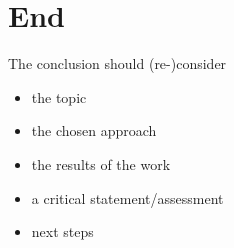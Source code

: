 \section{End} %
The conclusion should (re-)consider
\begin{itemize}
  \item the topic
  \item the chosen approach
  \item the results of the work
  \item a critical statement/assessment
  \item next steps
\end{itemize}

